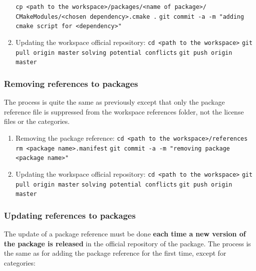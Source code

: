 \documentclass[12pt,a4paper]{article}
\begin{document}
\begin{enumerate}
\linebreak \verb|cp <path to the workspace>/packages/<name of package>/|
\linebreak \verb| CMakeModules/<chosen dependency>.cmake .|
\linebreak \verb|git commit -a -m "adding cmake script for <dependency>"|
\item Updating the workspace official repository:
\linebreak \verb|cd <path to the workspace>|
\linebreak \verb|git pull origin master|
\linebreak \verb|solving potential conflicts|
\linebreak \verb|git push origin master|
\end{enumerate}

\subsubsection{Removing references to packages}

The process is quite the same as previously except that only the package reference file is suppressed from the workspace references folder, not the license files or the categories.
\begin{enumerate}
\item Removing the package reference:
\linebreak \verb|cd <path to the workspace>/references|
\linebreak \verb|rm <package name>.manifest|
\linebreak \verb|git commit -a -m "removing package <package name>"|
\item Updating the workspace official repository:
\linebreak \verb|cd <path to the workspace>|
\linebreak \verb|git pull origin master|
\linebreak \verb|solving potential conflicts|
\linebreak \verb|git push origin master|
\end{enumerate}

\subsubsection{Updating references to packages}

The update of a package reference must be done \textbf{each time a new version of the package is released} in the official repository of the package. The process is the same as for adding the package reference for the first time, except for categories:
\end{document}
